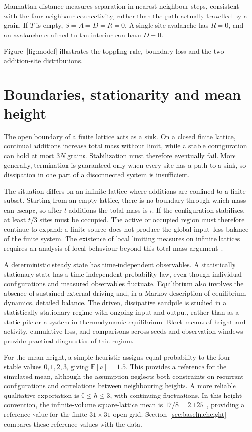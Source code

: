 \documentclass[11pt,a4paper,oneside]{report}
\newcommand{\E}{\mathbb{E}}
\numberwithin{equation}{chapter}
\begin{document}
Manhattan distance measures separation in nearest-neighbour steps, consistent with the four-neighbour connectivity, rather than the path actually travelled by a grain. If $T$ is empty, $S=A=D=R=0$. A single-site avalanche has $R=0$, and an avalanche confined to the interior can have $D=0$.

Figure~\ref{fig:model} illustrates the toppling rule, boundary loss and the two addition-site distributions.

\FloatBarrier

\section{Boundaries, stationarity and mean height}
\label{sec:stationarity}
The open boundary of a finite lattice acts as a sink. On a closed finite lattice, continual additions increase total mass without limit, while a stable configuration can hold at most $3N$ grains. Stabilization must therefore eventually fail. More generally, termination is guaranteed only when every site has a path to a sink, so dissipation in one part of a disconnected system is insufficient.

The situation differs on an infinite lattice where additions are confined to a finite subset. Starting from an empty lattice, there is no boundary through which mass can escape, so after $t$ additions the total mass is $t$. If the configuration stabilizes, at least $t/3$ sites must be occupied. The active or occupied region must therefore continue to expand; a finite source does not produce the global input--loss balance of the finite system. The existence of local limiting measures on infinite lattices requires an analysis of local behaviour beyond this total-mass argument~\cite{jarai2018}.

A deterministic steady state has time-independent observables. A statistically stationary state has a time-independent probability law, even though individual configurations and measured observables fluctuate. Equilibrium also involves the absence of sustained external driving and, in a Markov description of equilibrium dynamics, detailed balance. The driven, dissipative sandpile is studied in a statistically stationary regime with ongoing input and output, rather than as a static pile or a system in thermodynamic equilibrium. Block means of height and activity, cumulative loss, and comparisons across seeds and observation windows provide practical diagnostics of this regime.

For the mean height, a simple heuristic assigns equal probability to the four stable values $0,1,2,3$, giving $\E[h]=1.5$. This provides a reference for the simulated mean, although the assumption neglects both constraints on recurrent configurations and correlations between neighbouring heights. A more reliable qualitative expectation is $0\leq\bar h\leq3$, with continuing fluctuations. In this height convention, the infinite-volume square-lattice mean is $17/8=2.125$~\cite{jarai2018}, providing a reference value for the finite $31\times31$ open grid. Section~\ref{sec:baselineheight} compares these reference values with the data.
\end{document}
